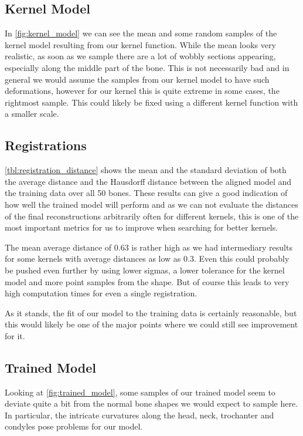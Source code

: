 \subsection{Kernel Model}
\label{subsec:kernmodeldisc}
In \autoref{fig:kernel_model} we can see the mean and some random samples of the kernel model resulting from our kernel function. While the mean looks very realistic, as soon as we sample there are a lot of wobbly sections appearing, especially along the middle part of the bone. This is not necessarily bad and in general we would assume the samples from our kernel model to have such deformations, however for our kernel this is quite extreme in some cases, \eg the rightmost sample. This could likely be fixed using a different kernel function with a smaller scale.


\subsection{Registrations}
\label{subsec:registrresultsdisc}
\autoref{tbl:registration_distance} shows the mean and the standard deviation of both the average distance and the Hausdorff distance between the aligned model and the training data over all 50 bones. These results can give a good indication of how well the trained model will perform and as we can not evaluate the distances of the final reconstructions arbitrarily often for different kernels, this is one of the most important metrics for us to improve when searching for better kernels.

The mean average distance of 0.63 is rather high as we had intermediary results for some kernels with average distances as low as 0.3. Even this could probably be pushed even further by using lower sigmas, a lower tolerance for the kernel model and more point samples from the shape. But of course this leads to very high computation times for even a single registration.

As it stands, the fit of our model to the training data is certainly reasonable, but this would likely be one of the major points where we could still see improvement for it.


\subsection{Trained Model}
\label{subsec:trainedmodeldisc}
Looking at \autoref{fig:trained_model}, some samples of our trained model seem to deviate quite a bit from the normal bone shapes we would expect to sample here. In particular, the intricate curvatures along the head, neck, trochanter and condyles pose problems for our model.

